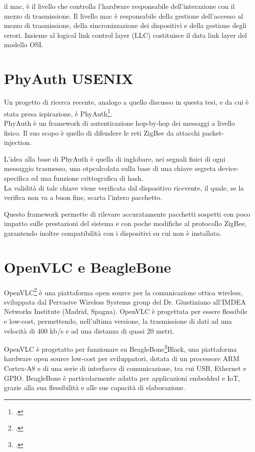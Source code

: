 il \gls{mac}, è il livello che controlla l'hardware responsabile dell'interazione con il mezzo di trasmissione. Il livello \gls{mac} è responsabile della gestione dell'accesso al mezzo di trasmissione, della sincronizzazione dei dispositivi e della gestione degli errori. Insieme al logical link control layer (LLC) costituisce il data link layer del modello OSI.

\section{PhyAuth USENIX}
Un progetto di ricerca recente, analogo a quello discusso in questa tesi, e da cui è stata presa ispirazione, è PhyAuth\footcite{phyauth2023}.\\
PhyAuth è un framework di autenticazione hop-by-hop dei messaggi a livello fisico. Il suo scopo è quello di difendere le reti ZigBee da attacchi packet-injection.

L'idea alla base di PhyAuth è quella di inglobare, nei segnali fisici di ogni messaggio trasmesso, una \gls{otp}\glsfirstoccur calcolata sulla base di una chiave segreta device-specifica ed una funzione crittografica di hash.\\
La validità di tale chiave viene verificata dal dispositivo ricevente, il quale, se la verifica non va a buon fine, scarta l'intero pacchetto.

Questo framework permette di rilevare accuratamente pacchetti sospetti con poco impatto sulle prestazioni del sistema e con poche modifiche al protocollo ZigBee, garantendo inoltre compatibilità con i dispositivi su cui non è installato.

\section{OpenVLC e BeagleBone}
OpenVLC\footcite{site:openvlc} è una piattaforma open source per la comunicazione ottica wireless, sviluppata dal Pervasive Wireless Systems group del Dr. Giustiniano all'IMDEA Networks Institute (Madrid, Spagna).
OpenVLC è progettata per essere flessibile e low-cost, permettendo, nell'ultima versione, la trasmissione di dati ad una velocità di 400 kb/s e ad una distanza di quasi 20 metri.

OpenVLC è progetatto per funzionare su BeagleBone\footcite{site:beaglebone}Black, una piattaforma hardware open source low-cost per sviluppatori, dotata di un processore ARM Cortex-A8 e di una serie di interfacce di comunicazione, tra cui USB, Ethernet e GPIO. BeagleBone è particolarmente adatta per applicazioni embedded e IoT, grazie alla sua flessibilità e alle sue capacità di elaborazione.
